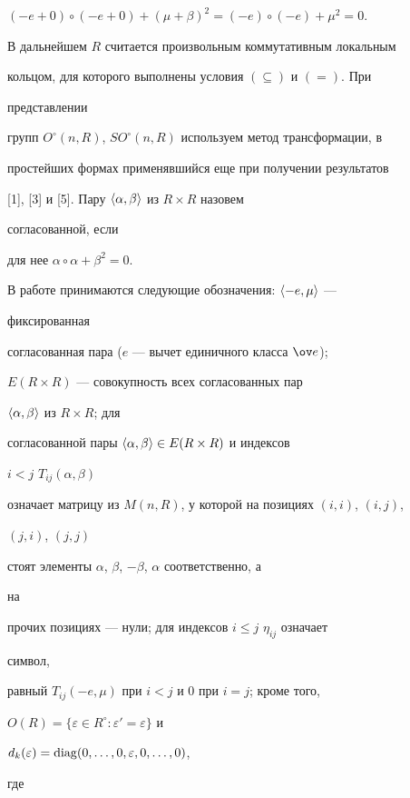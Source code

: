 $(-e+0)\circ(-e+0)+(\mu+\beta)^2=(-e)\circ(-e)+\mu^2=0$. 


 


В дальнейшем $R$ считается произвольным коммутативным локальным 


кольцом, для которого выполнены условия $(\subseteq)$ и $(=)$. При 


представлении 


групп $O^\circ(n,R)$, $SO^\circ(n,R)$ используем метод трансформации, в 


простейших формах применявшийся еще при получении результатов 


[1], [3] и [5]. Пару $\langle\alpha,\beta\rangle$ из $R\times R$ назовем 


согласованной, если 


для нее $\alpha\circ\alpha+\beta^2=0$. 


 


В работе принимаются следующие обозначения: $\langle-e,\mu\rangle$ --- 


фиксированная 


согласованная пара ($e$ --- вычет единичного класса $\ov e$); 


$E(R\times R)$ --- совокупность всех согласованных пар 


$\langle\alpha,\beta\rangle$ из $R\times R$; для 


согласованной пары $\langle\alpha,\beta\rangle\in E(R\times R)$ и индексов 


$i<j$\; $T_{ij}(\alpha,\beta)$ 


означает матрицу из $M(n,R)$, у которой на позициях $(i,i)$, $(i,j)$, 


$(j,i)$, $(j,j)$ 


стоят элементы $\alpha$, $\beta$, $-\beta$, $\alpha$ соответственно, а 


на 


прочих позициях --- нули; для индексов $i\le j$\; $\eta_{ij}$ означает 


символ, 


равный $T_{ij}(-e,\mu)$ при $i<j$ и $0$ при $i=j$; кроме того, 


$O(R)=\{\varepsilon\in R^\circ:\varepsilon'=\varepsilon\}$ и 


$d_k(\varepsilon)=\operatorname{diag}(0,\dotsc,0,\varepsilon,0,\dotsc,0)$, 




где 


